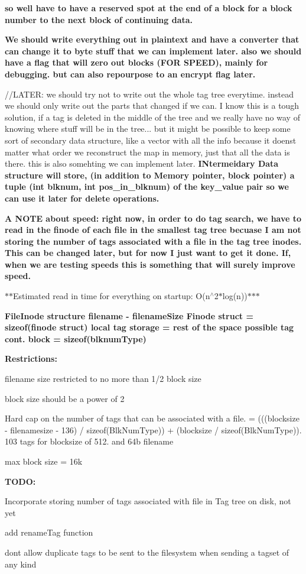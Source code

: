 {\bfseries so we\textquotesingle{}ll have to have a reserved spot at the end of a block for a block number to the next block of continuing data.}

{\bfseries We should write everything out in plaintext and have a converter that can change it to byte stuff that we can implement later. also we should have a flag that will zero out blocks (F\+OR S\+P\+E\+ED), mainly for debugging. but can also repourpose to an encrypt flag later.}

//\+L\+A\+T\+ER\+: we should try not to write out the whole tag tree everytime. instead we should only write out the parts that changed if we can. I know this is a tough solution, if a tag is deleted in the middle of the tree and we really have no way of knowing where stuff will be in the tree... but it might be possible to keep some sort of secondary data structure, like a vector with all the info because it doens\textquotesingle{}t matter what order we reconstruct the map in memory, just that all the data is there. this is also somehting we can implement later. {\bfseries I\+Ntermeidary Data structure will store, (in addition to Memory pointer, block pointer) a tuple (int blknum, int pos\+\_\+in\+\_\+blknum) of the key\+\_\+value pair so we can use it later for delete operations.}

{\bfseries A N\+O\+TE about speed\+: right now, in order to do tag search, we have to read in the finode of each file in the smallest tag tree becuase I am not storing the number of tags associated with a file in the tag tree inodes. This can be changed later, but for now I just want to get it done. If, when we are testing speeds this is something that will surely improve speed.}

$\ast$$\ast$\+Estimated read in time for everything on startup\+: O(n$^\wedge$2$\ast$log(n))$\ast$$\ast$$\ast$

{\bfseries File\+Inode structure filename -\/ filename\+Size Finode struct = sizeof(finode struct) local tag storage = rest of the space possible tag cont. block = sizeof(blknum\+Type)}

{\bfseries Restrictions\+:}
\begin{DoxyEnumerate}
\item filename size restricted to no more than 1/2 block size
\item block size should be a power of 2
\item Hard cap on the number of tags that can be associated with a file. = (((blocksize -\/ filenamesize -\/ 136) / sizeof(\+Blk\+Num\+Type)) + (blocksize / sizeof(\+Blk\+Num\+Type)). 103 tags for blocksize of 512. and 64b filename
\item max block size = 16k
\end{DoxyEnumerate}

{\bfseries T\+O\+DO\+:}
\begin{DoxyEnumerate}
\item Incorporate storing number of tags associated with file in Tag tree on disk, not yet
\item add rename\+Tag function
\item don\textquotesingle{}t allow duplicate tags to be sent to the filesystem when sending a tagset of any kind 
\end{DoxyEnumerate}